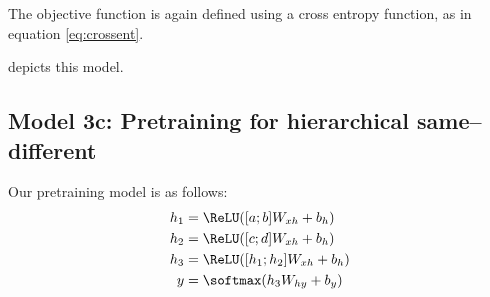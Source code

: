The objective function is again defined using a cross entropy function, as in equation \ref{eq:crossent}.

 depicts this model.




\subsection{Model 3c: Pretraining for hierarchical same--different}\label{sec:model3b}



Our pretraining model is as follows:
%
\begin{align}
  h_1 &= \ReLU([a;b]W_{xh} + b_{h}) \label{eq:preh1-supp}\\
  h_2 &= \ReLU([c;d]W_{xh} + b_{h})\\
  h_3 &= \ReLU([h_1;h_2]W_{xh} + b_{h}) \\
  y &= \softmax(h_3W_{hy} + b_{y}) \label{eq:prey-supp}\
\end{align}
%

